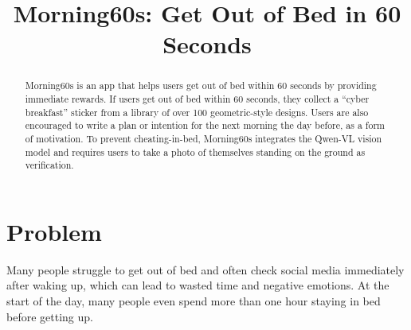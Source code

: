 \documentclass[manuscript,anonymous,review]{acmart}
\title{Morning60s: Get Out of Bed in 60 Seconds}
\author{}
\affiliation{%
  \institution{}
  \country{}
}
\begin{document}
\pagestyle{standardpagestyle}

\makeatletter
\renewcommand{\@manuscriptdates}{}
\renewcommand{\@copyrightpermission}{}
\makeatother

\begin{abstract}
Morning60s is an app that helps users get out of bed within 60 seconds by providing immediate rewards. If users get out of bed within 60 seconds, they collect a ``cyber breakfast'' sticker from a library of over 100 geometric-style designs. Users are also encouraged to write a plan or intention for the next morning the day before, as a form of motivation. To prevent cheating-in-bed, Morning60s integrates the Qwen-VL vision model and requires users to take a photo of themselves standing on the ground as verification.
\end{abstract}


\maketitle


\section{Problem}
Many people struggle to get out of bed and often check social media immediately after waking up, which can lead to wasted time and negative emotions. At the start of the day, many people even spend more than one hour staying in bed before getting up.
\end{document}

